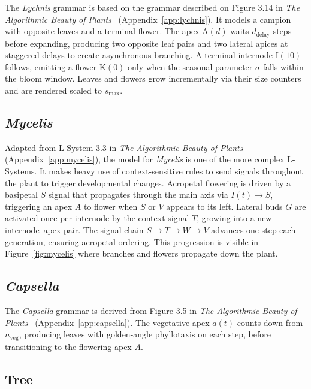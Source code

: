 The \textit{Lychnis} grammar is based on the grammar described on Figure 3.14 in \textit{The Algorithmic
Beauty of Plants}~\cite{prusinkiewiczAlgorithmicBeautyPlants1990} (Appendix~\ref{app:lychnis}). It models a
campion with opposite leaves and a terminal flower. The apex $\mathrm{A}(d)$ waits $d_{\text{delay}}$ steps
before expanding, producing two opposite leaf pairs and two lateral apices at staggered delays to create
asynchronous branching. A terminal internode $\mathrm{I}(10)$ follows, emitting a flower $\mathrm{K}(0)$ only
when the seasonal parameter $\sigma$ falls within the bloom window. Leaves and flowers grow incrementally via
their size counters and are rendered scaled to $s_{\max}$.

\subsection{\textit{Mycelis}}

Adapted from L-System 3.3 in \textit{The Algorithmic Beauty of
Plants}~\cite{prusinkiewiczAlgorithmicBeautyPlants1990} (Appendix~\ref{app:mycelis}), the model for
\textit{Mycelis} is one of the more complex L-Systems. It makes heavy use of context-sensitive rules to send
signals throughout the plant to trigger developmental changes. Acropetal flowering is driven by a basipetal
$S$ signal that propagates through the main axis via $I(t)\!\to\!S$, triggering an apex $A$ to flower when
$S$ or $V$ appears to its left. Lateral buds $G$ are activated once per internode by the context signal $T$,
growing into a new internode--apex pair. The signal chain $S\!\to\!T\!\to\!W\!\to\!V$ advances one step each
generation, ensuring acropetal ordering. This progression is visible in Figure~\ref{fig:mycelis} where
branches and flowers propagate down the plant.

\subsection{\textit{Capsella}}

The \textit{Capsella} grammar is derived from Figure 3.5 in \textit{The Algorithmic Beauty of
Plants}~\cite{prusinkiewiczAlgorithmicBeautyPlants1990} (Appendix~\ref{app:capsella}). The vegetative apex
$a(t)$ counts down from $n_{\mathrm{veg}}$, producing leaves with golden-angle phyllotaxis on each step,
before transitioning to the flowering apex $A$.

\subsection{Tree}

